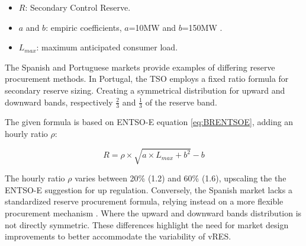 \begin{itemize}
  \item $R$: Secondary Control Reserve.
  \item $a$ and $b$: empiric coefficients, $a$=10MW and $b$=150MW .
  \item $L_{max}$: maximum anticipated consumer load.
\end{itemize}

The Spanish and Portuguese markets provide examples of differing reserve procurement methods. In Portugal, the \gls{TSO} employs a fixed ratio formula for secondary reserve sizing. Creating a symmetrical distribution for upward and downward bands, respectively $\frac{2}{3}$ and $\frac{1}{3}$ of the reserve band.\par
The given formula is based on \gls{ENTSO-E} equation \eqref{eq:BRENTSOE}, adding an hourly ratio $\rho$:

\begin{linenomath}
  \begin{equation}\label{eq:BRREN} 
    R = \rho \times \sqrt{a \times  L_{max} + b^{2}} - b 
  \end{equation}
  \end{linenomath}

The hourly ratio $\rho$ varies between 20\% (1.2) and 60\% (1.6), upscaling the the ENTSO-E suggestion for up regulation.
%
Conversely, the Spanish market lacks a standardized reserve procurement formula, relying instead on a more flexible procurement mechanism \cite{Frade2019_market}. Where the upward and downward bands distribution is not directly symmetric.
These differences highlight the need for market design improvements to better accommodate the variability of \gls{vRES}.

